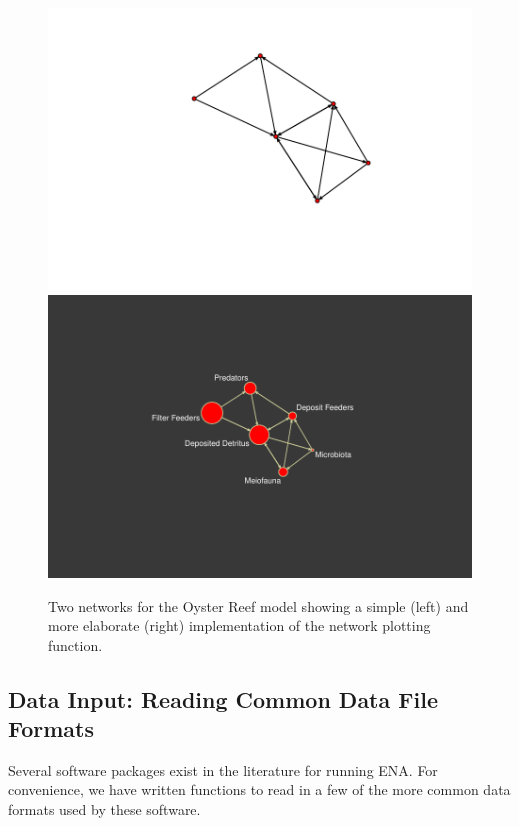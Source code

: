 \documentclass[article]{jss}
\begin{document}
\begin{figure}
\includegraphics{enaR-vignette-014}
\includegraphics{enaR-vignette-015}
\caption{Two networks for the Oyster Reef model
  \citep{dame81} showing a simple (left) and more elaborate (right)
  implementation of the network plotting function.} \label{fig:oyster}
\end{figure}





\subsection{Data Input: Reading Common Data File Formats}
Several software packages exist in the literature for running ENA.  For
convenience, we have written functions to read in a few of the more
common data formats used by these software.
\end{document}
